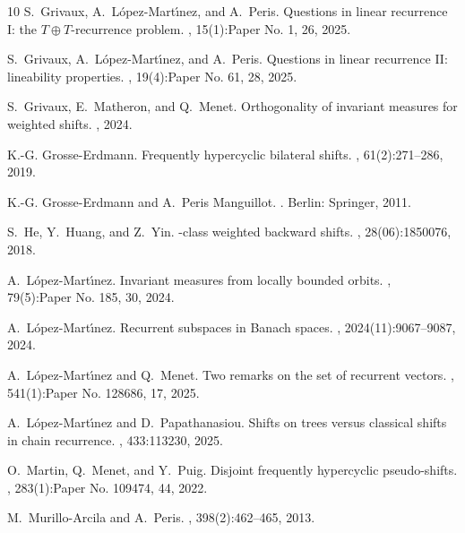 \documentclass[11pt]{amsart}
\begin{document}
\begin{thebibliography}{10}
S.~Grivaux, A.~L\'{o}pez-Mart\'{\i}nez, and A.~Peris.
\newblock Questions in linear recurrence {I}: the {$T\oplus T$}-recurrence
  problem.
, 15(1):Paper No. 1, 26, 2025.

S.~Grivaux, A.~L\'{o}pez-Mart\'{\i}nez, and A.~Peris.
\newblock Questions in linear recurrence {II}: lineability properties.
, 19(4):Paper No. 61, 28, 2025.

S.~Grivaux, E.~Matheron, and Q.~Menet.
\newblock Orthogonality of invariant measures for weighted shifts.
, 2024.

K.-G. Grosse-Erdmann.
\newblock Frequently hypercyclic bilateral shifts.
, 61(2):271--286, 2019.

K.-G. {Grosse-Erdmann} and A.~{Peris Manguillot}.
.
\newblock Berlin: Springer, 2011.

S.~He, Y.~Huang, and Z.~Yin.
-class weighted backward shifts.
, 28(06):1850076,
  2018.

A.~L\'{o}pez-Mart\'{\i}nez.
\newblock Invariant measures from locally bounded orbits.
, 79(5):Paper No. 185, 30, 2024.

A.~L{\'o}pez-Mart{\'\i}nez.
\newblock Recurrent subspaces in {B}anach spaces.
,
  2024(11):9067--9087, 2024.

A.~L\'{o}pez-Mart\'{\i}nez and Q.~Menet.
\newblock Two remarks on the set of recurrent vectors.
, 541(1):Paper No. 128686, 17, 2025.

A.~L{\'o}pez-Mart{\'\i}nez and D.~Papathanasiou.
\newblock Shifts on trees versus classical shifts in chain recurrence.
, 433:113230, 2025.

O.~Martin, Q.~Menet, and Y.~Puig.
\newblock Disjoint frequently hypercyclic pseudo-shifts.
, 283(1):Paper No. 109474, 44, 2022.

M.~Murillo-Arcila and A.~Peris.
, 398(2):462--465, 2013.

\end{thebibliography}
\end{document}
